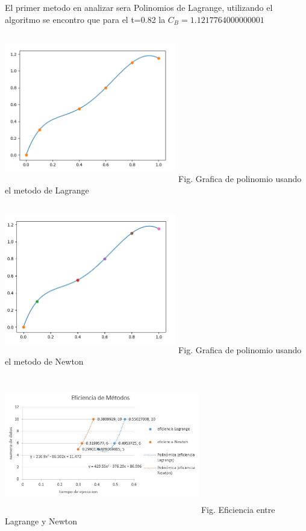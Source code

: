 \documentclass[10pt,a4paper]{article}
\begin{document}
\begin{multicols}{2}
		
		
		
		
		
		
		
		
		
		
		El primer metodo en analizar sera Polinomios de Lagrange, utilizando el algoritmo se encontro que para el t=0.82 la $C_B = 1.1217764000000001$ 
		
		\begin{center}
			\includegraphics[width=7.5cm,height=6.5cm]{Lagrange.png}
			Fig. Grafica de polinomio usando el metodo de Lagrange
		\end{center}
		
		
		\begin{center}
			\includegraphics[width=7.5cm,height=6.5cm]{Newton.png}
			Fig. Grafica de polinomio usando el metodo de Newton
		\end{center}
		
		
		\begin{center}
			\includegraphics[width=8.5cm,height=6cm]{eficiencia.jpg}
			Fig. Eficiencia entre Lagrange y Newton
		\end{center}
		

\end{multicols}
\end{document}
